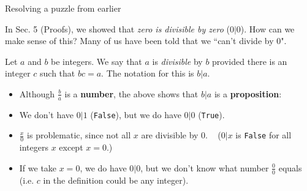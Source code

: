 \documentclass[10pt]{beamer}
\begin{document}
\begin{frame}{Resolving a puzzle from earlier}
\footnotesize 
\begin{myyellowbox}[title=Puzzle]
In Sec. 5 (Proofs), we showed that  \textit{zero is divisible by zero} ($0|0$). How can we make sense of this? Many of us have been told that we ``can't divide by 0". \end{myyellowbox}
\pause 
\vfill 
	\begin{mydef}[title=Reminder of Definition 3.2 (\textbf{Divisible})]
	Let $a$ and $b$ be integers.  We say that $a$ is \textit{divisible} by $b$ provided there is an integer $c$ such that $bc=a$. The notation for this is $b|a$. 
	\end{mydef}
\vfill 
\begin{myredbox}[title=Observations]   
\begin{itemize}
\item  Although $\frac{b}{a}$ is a \textbf{number},  the above shows that $b|a$ is a \textbf{proposition}: 
\item 	We don’t have $0|1$ (\texttt{False}), but we do have $0|0$ (\texttt{True}).   
\end{itemize}
\end{myredbox}

\begin{myyellowbox}[title=Resolution to Puzzle]
\begin{itemize}
\item $\frac{x}{0}$ is problematic, since not all $x$ are divisible by 0.   ($0|x$ is \texttt{False} for all integers $x$ except $x=0$.)
\item If we take $x=0$, we do have $0|0$, but we don't know what number  $\frac{0}{0}$ equals (i.e. $c$ in the definition could be any integer).  %
\end{itemize}

\end{myyellowbox}


\end{frame}
\end{document}
